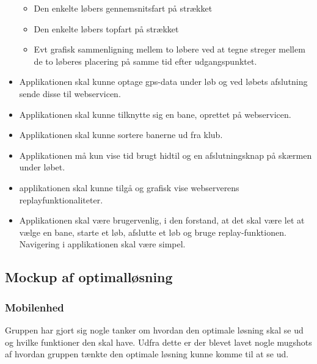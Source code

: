 \begin{itemize}
\begin{itemize}
		\item Den enkelte løbers gennemsnitsfart på strækket
		\item Den enkelte løbers topfart på strækket
		\item Evt grafisk sammenligning mellem to løbere ved at tegne streger mellem de to løberes placering på samme tid efter udgangspunktet.
	\end{itemize}
	\item Applikationen skal kunne optage gps-data under løb og ved løbets afslutning sende disse til webservicen.
	\item Applikationen skal kunne tilknytte sig en bane, oprettet på webservicen.
	\item Applikationen skal kunne sortere banerne ud fra klub.
	\item Applikationen må kun vise tid brugt hidtil og en afslutningsknap på skærmen under løbet.
	\item applikationen skal kunne tilgå og grafisk vise webserverens replayfunktionaliteter.
	\item Applikationen skal være brugervenlig, i den forstand, at det skal være let at vælge en bane, starte et løb, afslutte et løb og bruge replay-funktionen. Navigering i applikationen skal være simpel.
\end{itemize}

\subsection{Mockup af optimalløsning}
\subsubsection{Mobilenhed}
Gruppen har gjort sig nogle tanker om hvordan den optimale løsning skal se ud og hvilke funktioner den skal have. Udfra dette er der blevet lavet nogle mugshots af hvordan gruppen tænkte den optimale løsning kunne komme til at se ud.

